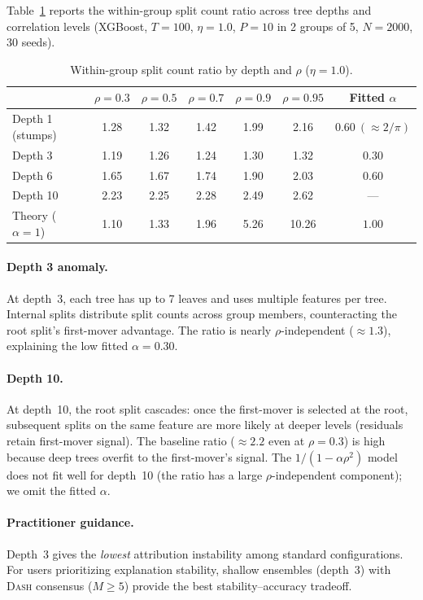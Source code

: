 \documentclass{article}
\newcommand{\DASH}{\textsc{Dash}}
\begin{document}
Table~\ref{tab:depth-rho} reports the within-group split count ratio
across tree depths and correlation levels (XGBoost, $T{=}100$, $\eta{=}1.0$,
$P{=}10$ in 2 groups of 5, $N{=}2000$, 30 seeds).

\begin{table}[htbp]
\centering
\caption{Within-group split count ratio by depth and $\rho$ ($\eta{=}1.0$).}
\label{tab:depth-rho}
\small
\begin{tabular}{@{}lcccccc@{}}
\toprule
 & $\rho{=}0.3$ & $\rho{=}0.5$ & $\rho{=}0.7$ & $\rho{=}0.9$ & $\rho{=}0.95$ & Fitted $\alpha$ \\
\midrule
Depth 1 (stumps) & 1.28 & 1.32 & 1.42 & 1.99 & 2.16 & $0.60\ (\approx 2/\pi)$ \\
Depth 3          & 1.19 & 1.26 & 1.24 & 1.30 & 1.32 & $0.30$ \\
Depth 6          & 1.65 & 1.67 & 1.74 & 1.90 & 2.03 & $0.60$ \\
Depth 10         & 2.23 & 2.25 & 2.28 & 2.49 & 2.62 & --- \\
\midrule
Theory ($\alpha{=}1$) & 1.10 & 1.33 & 1.96 & 5.26 & 10.26 & $1.00$ \\
\bottomrule
\end{tabular}
\end{table}

\paragraph{Depth 3 anomaly.}
At depth~3, each tree has up to 7 leaves and uses multiple features per
tree. Internal splits distribute split counts across group members,
counteracting the root split's first-mover advantage.
The ratio is nearly $\rho$-independent (${\approx}1.3$), explaining the
low fitted $\alpha = 0.30$.

\paragraph{Depth 10.}
At depth~10, the root split cascades: once the first-mover is selected
at the root, subsequent splits on the same feature are more likely at
deeper levels (residuals retain first-mover signal). The baseline ratio
(${\approx}2.2$ even at $\rho{=}0.3$) is high because deep trees
overfit to the first-mover's signal.
The $1/(1{-}\alpha\rho^2)$ model does not fit well for depth~10 (the
ratio has a large $\rho$-independent component); we omit the fitted $\alpha$.

\paragraph{Practitioner guidance.}
Depth~3 gives the \emph{lowest} attribution instability among standard
configurations. For users prioritizing explanation stability, shallow
ensembles (depth~3) with \DASH{} consensus ($M \geq 5$) provide the
best stability--accuracy tradeoff.
\end{document}
